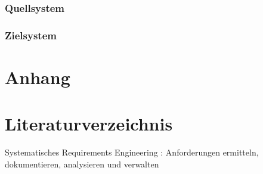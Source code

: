 \documentclass[10pt]{article}
\begin{document}
\subsubsection{Quellsystem}
\subsubsection{Zielsystem}
\subsection{}
\section{Anhang}
\newpage
\section{Literaturverzeichnis}
Systematisches Requirements Engineering : Anforderungen ermitteln, dokumentieren, analysieren und verwalten 
\end{document}
